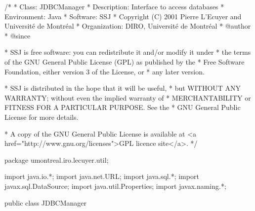 \begin{code}\begin{hide}
/*
 * Class:        JDBCManager
 * Description:  Interface to access databases
 * Environment:  Java
 * Software:     SSJ 
 * Copyright (C) 2001  Pierre L'Ecuyer and Université de Montréal
 * Organization: DIRO, Université de Montréal
 * @author       
 * @since

 * SSJ is free software: you can redistribute it and/or modify it under
 * the terms of the GNU General Public License (GPL) as published by the
 * Free Software Foundation, either version 3 of the License, or
 * any later version.

 * SSJ is distributed in the hope that it will be useful,
 * but WITHOUT ANY WARRANTY; without even the implied warranty of
 * MERCHANTABILITY or FITNESS FOR A PARTICULAR PURPOSE.  See the
 * GNU General Public License for more details.

 * A copy of the GNU General Public License is available at
   <a href="http://www.gnu.org/licenses">GPL licence site</a>.
 */
\end{hide}
package umontreal.iro.lecuyer.util;
\begin{hide}
import java.io.*;
import java.net.URL;
import java.sql.*;
import javax.sql.DataSource;
import java.util.Properties;
import javax.naming.*;
\end{hide}

public class JDBCManager\begin{hide} {
\end{hide}\end{code}
